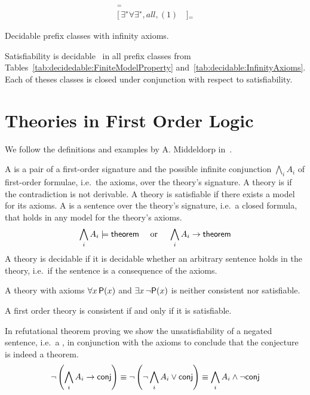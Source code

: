 \begin{table}[hbt]
	\begin{align*}
	[ \, all, (\omega), (1)& \, ]{}_{=} \tag{Rabin 1969}
	\\
	[ \, \exists^{∗}\forall\exists^{∗}, all, (1)& \, ]{}_{=} \tag{Shelah 1977}
	\end{align*}
	\caption[Decidable prefix classes (infinite)]{Decidable prefix classes with infinity axioms.}\label{tab:decidable:InfinityAxioms}
\end{table}

\begin{lemma}
	Satisfiability is decidable~\cite{MR1482227} in all prefix classes from
	Tables~\ref{tab:decidedable:FiniteModelProperty} and~\ref{tab:decidable:InfinityAxioms}.
	Each of theses classes is closed under conjunction with respect to satisfiability.
\end{lemma}



\section{Theories in First Order Logic}\label{sec:decidable:fol:theories}

We follow the definitions and examples by A. Middeldorp in~\cite{AM2015L}.

\begin{definition}[Theory]
	A  is a pair of a first-order signature
	and the possible infinite conjunction \( \bigwedge_i A_i \) of first-order formulae,
	i.e.~the axioms, over the theory's signature.
	A theory is  if the contradiction is not derivable.
	A theory is satisfiable if there exists a model for its axioms.
%
	A  is a sentence over the theory's signature,
	i.e.~a closed formula, that holds in any model for the theory's axioms.
	\[
		\bigwedge_i A_i \models \mathsf{theorem}
		\quad\text{ or }\quad
		\bigwedge_i A_i \rightarrow \mathsf{theorem}
	\]
	A theory is decidable if it is decidable whether an arbitrary sentence holds in the theory, i.e.~if the sentence is a consequence of the axioms.
\end{definition}

\begin{example}
A theory with axioms \( \forall x\,\mathsf{P}(x) \) and \( \exists x\,\lnot\mathsf{P}(x) \) is neither consistent nor satisfiable.
\end{example}

\begin{lemma}
	A first order theory is consistent if and only if it is satisfiable.
\end{lemma}
%
\begin{remark}
In refutational theorem proving
we show the unsatisfiability
of a negated sentence,
i.e.~a ,
in conjunction with the axioms
to conclude that the conjecture is indeed a theorem.
\[
	\lnot\left(\bigwedge_i A_i \rightarrow \mathsf{conj}\right) \equiv
	\lnot\left(\lnot\bigwedge_i A_i \lor \mathsf{conj}\right) \equiv
	\bigwedge_i A_i \land \lnot \mathsf{conj}
\]
\end{remark}

